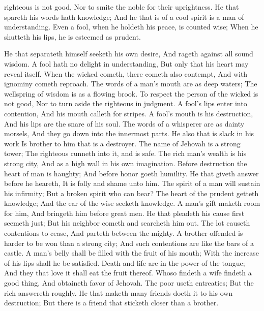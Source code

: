 righteous is not good, Nor to smite the noble for their uprightness.  He that spareth his words hath knowledge; And he that is of a cool spirit is a man of understanding.  Even a fool, when he holdeth his peace, is counted wise; When he shutteth his lips, he is esteemed as prudent. 

He that separateth himself seeketh his own desire, And rageth against all sound wisdom.  A fool hath no delight in understanding, But only that his heart may reveal itself.  When the wicked cometh, there cometh also contempt, And with ignominy cometh reproach.  The words of a man’s mouth are as deep waters; The wellspring of wisdom is as a flowing brook.  To respect the person of the wicked is not good, Nor to turn aside the righteous in judgment.  A fool’s lips enter into contention, And his mouth calleth for stripes.  A fool’s mouth is his destruction, And his lips are the snare of his soul.  The words of a whisperer are as dainty morsels, And they go down into the innermost parts.  He also that is slack in his work Is brother to him that is a destroyer.  The name of Jehovah is a strong tower; The righteous runneth into it, and is safe.  The rich man’s wealth is his strong city, And as a high wall in his own imagination.  Before destruction the heart of man is haughty; And before honor goeth humility.  He that giveth answer before he heareth, It is folly and shame unto him.  The spirit of a man will sustain his infirmity; But a broken spirit who can bear?  The heart of the prudent getteth knowledge; And the ear of the wise seeketh knowledge.  A man’s gift maketh room for him, And bringeth him before great men.  He that pleadeth his cause first seemeth just; But his neighbor cometh and searcheth him out.  The lot causeth contentions to cease, And parteth between the mighty.  A brother offended is harder to be won than a strong city; And such contentions are like the bars of a castle.  A man’s belly shall be filled with the fruit of his mouth; With the increase of his lips shall he be satisfied.  Death and life are in the power of the tongue; And they that love it shall eat the fruit thereof.  Whoso findeth a wife findeth a good thing, And obtaineth favor of Jehovah.  The poor useth entreaties; But the rich answereth roughly.  He that maketh many friends doeth it to his own destruction; But there is a friend that sticketh closer than a brother. 

